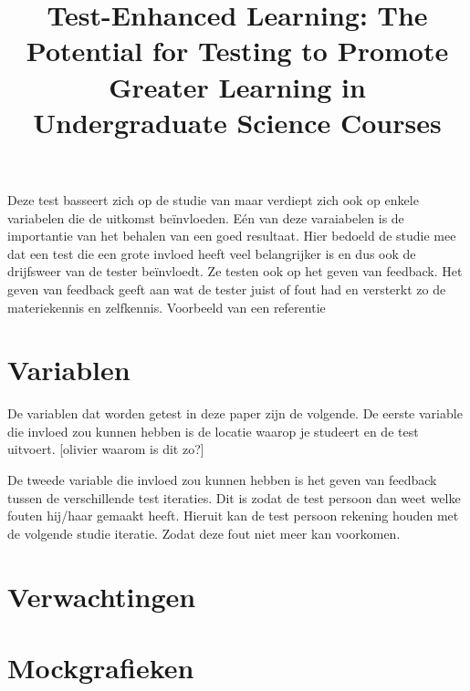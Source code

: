 \documentclass{hogent-article}
\begin{document}
    \title{Test-Enhanced Learning: The Potential for Testing to Promote Greater Learning in Undergraduate Science Courses}
    Deze test basseert zich op de studie van \autocite{} maar verdiept zich ook op enkele variabelen die de uitkomst beïnvloeden. Eén van deze varaiabelen is de importantie van het behalen van een goed resultaat. Hier bedoeld de studie mee dat een test die een grote invloed heeft veel belangrijker is en dus ook de drijfsweer van de tester beïnvloedt.
    Ze testen ook op het geven van feedback. Het geven van feedback geeft aan wat de tester juist of fout had en versterkt zo de materiekennis en zelfkennis.
	Voorbeeld van een referentie~\autocite{karpicke2008critical}
	
	\section{Variablen}
	De variablen dat worden getest in deze paper zijn de volgende.
	De eerste variable die invloed zou kunnen hebben is de locatie waarop je studeert en de test uitvoert.
	[olivier waarom is dit zo?]
	
	De tweede variable die invloed zou kunnen hebben is het geven van feedback tussen de verschillende test iteraties. 
	Dit is zodat de test persoon dan weet welke fouten hij/haar gemaakt heeft. Hieruit kan de test persoon rekening houden met de volgende studie iteratie. Zodat deze fout niet meer kan voorkomen. 
	
	
	\section{Verwachtingen}
	
	\section{Mockgrafieken}
	
	\printbibliography[heading=bibintoc]
	
\end{document}
